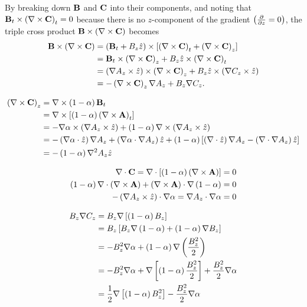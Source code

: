 \noindent By breaking down $\mathbf{B}$ and $\mathbf{C}$ into their components, and noting that $\mathbf{B}_t \times \left( \nabla \times\mathbf{C} \right)_t =0$ because there is no $z$-component of the gradient $\left( \frac{\partial}{\partial z}=0 \right)$, the triple cross product $\mathbf{B}\times\left( \nabla \times\mathbf{C} \right)$ becomes
\begin{equation}
    \begin{split}
        \mathbf{B}\times\left( \nabla \times\mathbf{C} \right) &= \left( \mathbf{B}_t + B_z\hat{z} \right)\times\left[ \left( \nabla \times\mathbf{C} \right)_t + \left( \nabla \times\mathbf{C} \right)_z \right] \\
        &= \mathbf{B}_t\times \left( \nabla \times\mathbf{C} \right)_z + B_z\hat{z}\times\left( \nabla \times\mathbf{C} \right)_t \\
        &= \left( \nabla A_z\times\hat{z} \right)\times \left( \nabla \times\mathbf{C} \right)_z + B_z\hat{z} \times \left( \nabla C_z\times\hat{z} \right) \\
        &= -\left( \nabla \times\mathbf{C} \right)_z\nabla A_z +  B_z\nabla C_z. \\
    \end{split}
\end{equation}

\[\begin{split}
    \left( \nabla \times\mathbf{C} \right)_z &= \nabla \times\left( 1-\alpha \right)\mathbf{B}_t \\
    &= \nabla \times\left[ \left( 1-\alpha \right)\left( \nabla \times\mathbf{A} \right)_t \right] \\
    &= -\nabla\alpha\times\left( \nabla A_z\times\hat{z} \right) + \left( 1-\alpha \right)\nabla \times \left( \nabla A_z\times\hat{z} \right) \\
    &= -\left( \nabla\alpha\cdot\hat{z} \right)\nabla A_z + \left( \nabla\alpha\cdot\nabla A_z \right)\hat{z} + \left( 1-\alpha \right)\left[ \left( \nabla \cdot\hat{z} \right)\nabla A_z - \left( \nabla \cdot\nabla A_z \right)\hat{z} \right] \\
    &= -\left( 1-\alpha \right)\nabla^2 A_z\hat{z} \\
\end{split}\]


\[\begin{split}
    \nabla \cdot\mathbf{C} = \nabla \cdot\left[ \left( 1-\alpha \right)\left( \nabla \times\mathbf{A} \right) \right] &= 0 \\
    \left( 1-\alpha \right)\nabla \cdot \left( \nabla \times\mathbf{A} \right) + \left( \nabla \times\mathbf{A} \right)\cdot\nabla\left( 1-\alpha \right) &= 0 \\
    -\left( \nabla A_z\times\hat{z} \right)\cdot\nabla{\alpha} = \nabla A_z \cdot\nabla\alpha &= 0 \\
\end{split}\]

\begin{equation}
    \begin{split}
        B_z\nabla C_z &= B_z\nabla\left[ \left( 1-\alpha \right)B_z \right] \\
        &= B_z\left[ B_z\nabla\left( 1-\alpha \right) + \left( 1-\alpha \right)\nabla B_z \right] \\
        &= -B_z^2\nabla\alpha + \left( 1-\alpha \right)\nabla\left( \frac{B_z^2}{2} \right) \\
        &= -B_z^2\nabla\alpha + \nabla\left[ \left( 1-\alpha \right)\frac{B_z^2}{2} \right] + \frac{B_z^2}{2}\nabla\alpha \\
        &= \frac{1}{2}\nabla\left[ \left( 1-\alpha \right)B_z^2 \right] - \frac{B_z^2}{2}\nabla\alpha
    \end{split}
\end{equation}

